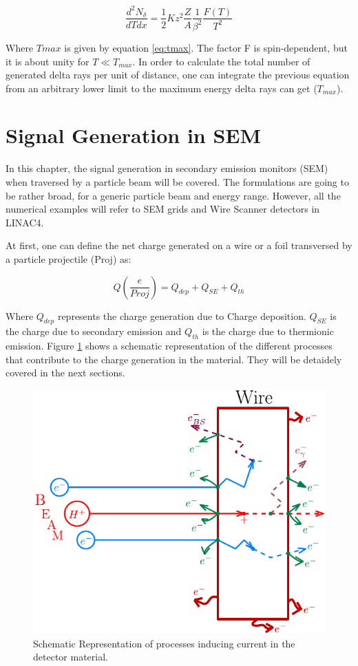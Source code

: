 \begin{equation}
    \frac{d^2N_{\delta}}{dTdx} = \frac{1}{2}Kz^2\frac{Z}{A}\frac{1}{\beta^2}\frac{F(T)}{T^2}
    \label{eq:deltaN}
\end{equation}

Where $Tmax$ is given by equation \ref{eq:tmax}. The factor F is spin-dependent, but it is about unity for $ T \ll  T_{max}$. In order to calculate the total number of generated delta rays per unit of distance, one can integrate the previous equation from an arbitrary lower limit to the maximum energy delta rays can get ($T_{max}$). 




\section{Signal Generation in SEM}

In this chapter, the signal generation in secondary emission monitors (SEM) when traversed by a particle beam will be covered. The formulations are going to be rather broad, for a generic particle beam and energy range. However, all the numerical examples will refer to SEM grids and Wire Scanner detectors in LINAC4. 

At first, one can define the net charge generated on a wire or a foil transversed by a particle projectile (Proj) as: 

\begin{equation}
    \label{eq:Qsum}
    Q\left(\frac{e}{Proj}\right) = Q_{dep} + Q_{SE} + Q_{th}
\end{equation}

Where $Q_{dep}$ represents the charge generation due to Charge deposition. $Q_{SE}$ is the charge due to secondary emission and $Q_{th}$ is the charge due to thermionic emission. Figure \ref{fig:SignalGeneration} shows a schematic representation of the different processes that contribute to the charge generation in the material. They will be detaidely covered in the next sections. 

\begin{figure}[h]
    \centering
    \includegraphics[width=0.50\columnwidth]{Figure_ChargeGeneration/ChargeGen.pdf}
    \caption{Schematic Representation of processes inducing current in the detector material.}
    \label{fig:SignalGeneration}
\end{figure}

